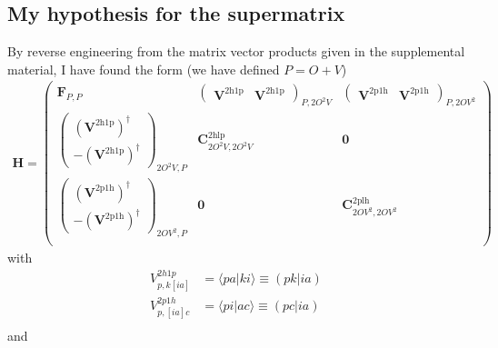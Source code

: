 \subsection{My hypothesis for the supermatrix}
By reverse engineering from the matrix vector products given in the supplemental material, I have found the form (we have defined $P=O+V$)
\begin{align}
    \bm{H} = \begin{pmatrix}
\bm{F}_{P,P} & \begin{pmatrix} \bm{V}^{2\mathrm{h1p}} & \bm{V}^{2\mathrm{h1p}} \end{pmatrix}_{P,2O^2V} & \begin{pmatrix} \bm{V}^{2\mathrm{p1h}} & \bm{V}^{2\mathrm{p1h}} \end{pmatrix}_{P,2OV^2}\\
\begin{pmatrix} \left(\bm{V}^{2\mathrm{h1p}}\right)^{\dagger} \\ -\left(\bm{V}^{2\mathrm{h1p}}\right)^{\dagger} \end{pmatrix}_{2O^2V,P} & \bm{C}^{2\mathrm{hlp}}_{2O^2V,2O^2V} & \bm{0} \\
\begin{pmatrix} \left(\bm{V}^{2\mathrm{p1h}}\right)^{\dagger} \\ -\left(\bm{V}^{2\mathrm{p1h}}\right)^{\dagger} \end{pmatrix}_{2OV^2,P} & \bm{0} & \bm{C}^{2\mathrm{plh}}_{2OV^2,2OV^2} \\
\end{pmatrix}
\label{supermatrix}
\end{align}
with 
\begin{align}
    V_{p, k[ia]}^{2h1p} &= \langle p a | k i \rangle \equiv (pk|ia) \\
    V_{p, [ia] c}^{2p1h} &= \langle p i | a c \rangle \equiv (pc|ia) \\
\label{c}
\end{align}
and 

